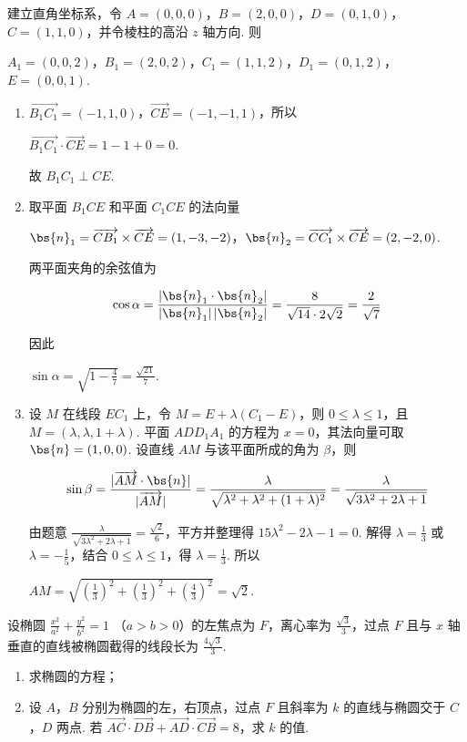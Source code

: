 \begin{solution}
建立直角坐标系，令 \(A=(0,0,0)\)，\(B=(2,0,0)\)，\(D=(0,1,0)\)，\(C=(1,1,0)\)，并令棱柱的高沿 \(z\) 轴方向. 则

\(A_{1}=(0,0,2)\)，\(B_{1}=(2,0,2)\)，\(C_{1}=(1,1,2)\)，\(D_{1}=(0,1,2)\)，\(E=(0,0,1)\).

\begin{enumerate}
\item \(\overrightarrow{B_{1}C_{1}}=(-1,1,0)\)，\(\overrightarrow{CE}=(-1,-1,1)\)，所以

\(\overrightarrow{B_{1}C_{1}}\cdot\overrightarrow{CE}=1-1+0=0\).

故 \(B_{1}C_{1}\perp CE\).

\item 取平面 \(B_{1}CE\) 和平面 \(C_{1}CE\) 的法向量

\(\bs{n}_{1}=\overrightarrow{CB_{1}}\times\overrightarrow{CE}=(1,-3,-2)\)，\(\bs{n}_{2}=\overrightarrow{CC_{1}}\times\overrightarrow{CE}=(2,-2,0)\).

两平面夹角的余弦值为

\[
\cos\alpha=\frac{|\bs{n}_{1}\cdot\bs{n}_{2}|}{|\bs{n}_{1}|\,|\bs{n}_{2}|}
=\frac{8}{\sqrt{14}\cdot2\sqrt{2}}=\frac{2}{\sqrt{7}}
\]

因此

\(\sin\alpha=\sqrt{1-\frac{4}{7}}=\frac{\sqrt{21}}{7}\).

\item 设 \(M\) 在线段 \(EC_{1}\) 上，令 \(M=E+\lambda(C_{1}-E)\)，则 \(0\leqslant\lambda\leqslant1\)，且 \(M=(\lambda,\lambda,1+\lambda)\). 平面 \(ADD_{1}A_{1}\) 的方程为 \(x=0\)，其法向量可取 \(\bs{n}=(1,0,0)\). 设直线 \(AM\) 与该平面所成的角为 \(\beta\)，则

\[
\sin\beta=\frac{|\overrightarrow{AM}\cdot\bs{n}|}{|\overrightarrow{AM}|}
=\frac{\lambda}{\sqrt{\lambda^2+\lambda^2+(1+\lambda)^2}}
=\frac{\lambda}{\sqrt{3\lambda^2+2\lambda+1}}
\]

由题意 \(\frac{\lambda}{\sqrt{3\lambda^2+2\lambda+1}}=\frac{\sqrt{2}}{6}\)，平方并整理得 \(15\lambda^2-2\lambda-1=0\). 解得 \(\lambda=\frac{1}{3}\) 或 \(\lambda=-\frac{1}{5}\)，结合 \(0\leqslant\lambda\leqslant1\)，得 \(\lambda=\frac{1}{3}\). 所以

\(AM=\sqrt{\left(\frac{1}{3}\right)^2+\left(\frac{1}{3}\right)^2+\left(\frac{4}{3}\right)^2}=\sqrt{2}\).
\end{enumerate}
\end{solution}

\begin{problem}
设椭圆 \(\frac{x^2}{a^2} + \frac{y^2}{b^2} = 1 \) （\(a > b > 0\)）的左焦点为 \(F\)，离心率为 \(\frac{\sqrt{3}}{3}\)，过点 \(F\) 且与 \(x\) 轴垂直的直线被椭圆截得的线段长为 \(\frac{4\sqrt{3}}{3}\).
\begin{enumerate}
\item 求椭圆的方程；
\item 设 \(A\)，\(B\) 分别为椭圆的左，右顶点，过点 \(F\) 且斜率为 \(k\) 的直线与椭圆交于 \(C\)，\(D\) 两点. 若 \(\overrightarrow{AC} \cdot \overrightarrow{DB} + \overrightarrow{AD} \cdot \overrightarrow{CB} = 8\)，求 \(k\) 的值.
\end{enumerate}
\end{problem}

